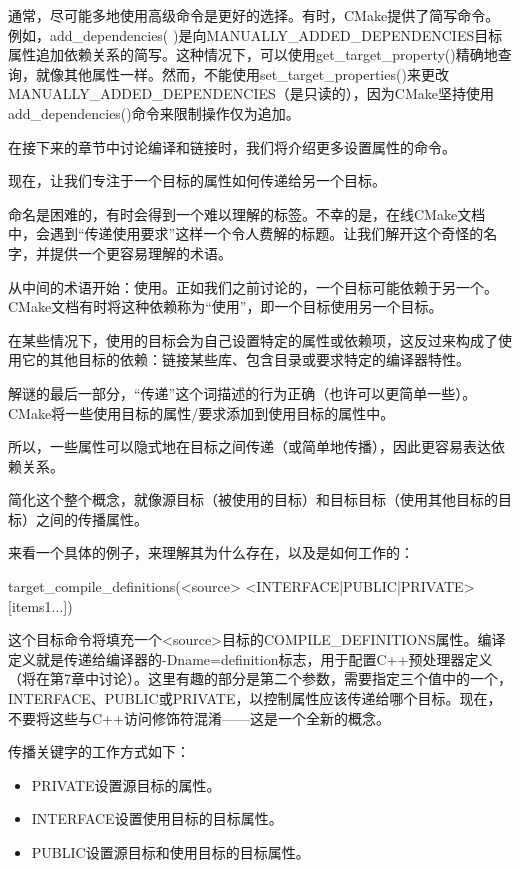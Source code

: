 通常，尽可能多地使用高级命令是更好的选择。有时，CMake提供了简写命令。例如，add\_dependencies( )是向MANUALLY\_ADDED\_DEPENDENCIES目标属性追加依赖关系的简写。这种情况下，可以使用get\_target\_property()精确地查询，就像其他属性一样。然而，不能使用set\_target\_properties()来更改MANUALLY\_ADDED\_DEPENDENCIES（是只读的），因为CMake坚持使用add\_dependencies()命令来限制操作仅为追加。

在接下来的章节中讨论编译和链接时，我们将介绍更多设置属性的命令。

现在，让我们专注于一个目标的属性如何传递给另一个目标。


命名是困难的，有时会得到一个难以理解的标签。不幸的是，在线CMake文档中，会遇到“传递使用要求”这样一个令人费解的标题。让我们解开这个奇怪的名字，并提供一个更容易理解的术语。

从中间的术语开始：使用。正如我们之前讨论的，一个目标可能依赖于另一个。CMake文档有时将这种依赖称为“使用”，即一个目标使用另一个目标。

在某些情况下，使用的目标会为自己设置特定的属性或依赖项，这反过来构成了使用它的其他目标的依赖：链接某些库、包含目录或要求特定的编译器特性。

解谜的最后一部分，“传递”这个词描述的行为正确（也许可以更简单一些）。CMake将一些使用目标的属性/要求添加到使用目标的属性中。

所以，一些属性可以隐式地在目标之间传递（或简单地传播），因此更容易表达依赖关系。

简化这个整个概念，就像源目标（被使用的目标）和目标目标（使用其他目标的目标）之间的传播属性。

来看一个具体的例子，来理解其为什么存在，以及是如何工作的：

\begin{shell}
target_compile_definitions(<source> <INTERFACE|PUBLIC|PRIVATE> [items1...])
\end{shell}

这个目标命令将填充一个<source>目标的COMPILE\_DEFINITIONS属性。编译定义就是传递给编译器的-Dname=definition标志，用于配置C++预处理器定义（将在第7章中讨论）。这里有趣的部分是第二个参数，需要指定三个值中的一个，INTERFACE、PUBLIC或PRIVATE，以控制属性应该传递给哪个目标。现在，不要将这些与C++访问修饰符混淆——这是一个全新的概念。

传播关键字的工作方式如下：

\begin{itemize}
\item
PRIVATE设置源目标的属性。

\item
INTERFACE设置使用目标的目标属性。

\item
PUBLIC设置源目标和使用目标的目标属性。
\end{itemize}

